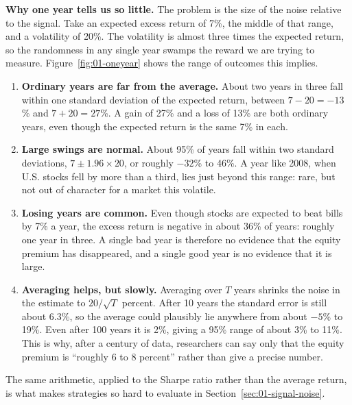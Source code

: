 \textbf{Why one year tells us so little.} The problem is the size of the noise relative to the signal. Take an expected excess return of 7\%, the middle of that range, and a volatility of 20\%. The volatility is almost three times the expected return, so the randomness in any single year swamps the reward we are trying to measure. Figure~\ref{fig:01-oneyear} shows the range of outcomes this implies.

\begin{enumerate}
  \item \textbf{Ordinary years are far from the average.} About two years in three fall within one standard deviation of the expected return, between $7 - 20 = -13$\% and $7 + 20 = 27$\%. A gain of 27\% and a loss of 13\% are both ordinary years, even though the expected return is the same 7\% in each.
  \item \textbf{Large swings are normal.} About 95\% of years fall within two standard deviations, $7 \pm 1.96 \times 20$, or roughly $-32$\% to 46\%. A year like 2008, when U.S. stocks fell by more than a third, lies just beyond this range: rare, but not out of character for a market this volatile.
  \item \textbf{Losing years are common.} Even though stocks are expected to beat bills by 7\% a year, the excess return is negative in about 36\% of years: roughly one year in three. A single bad year is therefore no evidence that the equity premium has disappeared, and a single good year is no evidence that it is large.
  \item \textbf{Averaging helps, but slowly.} Averaging over $T$ years shrinks the noise in the estimate to $20/\sqrt{T}$ percent. After 10 years the standard error is still about 6.3\%, so the average could plausibly lie anywhere from about $-5$\% to 19\%. Even after 100 years it is 2\%, giving a 95\% range of about 3\% to 11\%. This is why, after a century of data, researchers can say only that the equity premium is ``roughly 6 to 8 percent'' rather than give a precise number.
\end{enumerate}

The same arithmetic, applied to the Sharpe ratio rather than the average return, is what makes strategies so hard to evaluate in Section~\ref{sec:01-signal-noise}.


